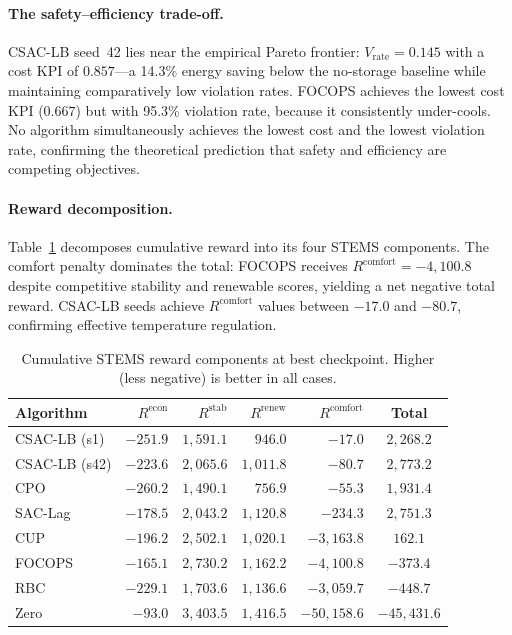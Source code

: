 \paragraph{The safety--efficiency trade-off.}
CSAC-LB seed~42 lies near the empirical Pareto frontier: $V_{\text{rate}} =
0.145$ with a cost KPI of $0.857$---a 14.3\% energy saving below the
no-storage baseline while maintaining comparatively low violation rates.
FOCOPS achieves the
lowest cost KPI ($0.667$) but with 95.3\% violation rate, because it
consistently under-cools.  No algorithm simultaneously achieves the lowest cost
and the lowest violation rate, confirming the theoretical prediction that
safety and efficiency are competing objectives.

\paragraph{Reward decomposition.}
Table~\ref{tab:reward-decomposition} decomposes cumulative reward into its four
STEMS components.  The comfort penalty dominates the total: FOCOPS receives
$R^{\text{comfort}} = -4{,}100.8$ despite competitive stability and renewable
scores, yielding a net negative total reward.  CSAC-LB seeds achieve
$R^{\text{comfort}}$ values between $-17.0$ and $-80.7$, confirming effective
temperature regulation.

\begin{table}[htbp]
\centering
\caption{Cumulative STEMS reward components at best checkpoint.
  Higher (less negative) is better in all cases.}
\label{tab:reward-decomposition}
\begin{tabular}{lrrrrc}
\toprule
\textbf{Algorithm}
  & $R^{\text{econ}}$
  & $R^{\text{stab}}$
  & $R^{\text{renew}}$
  & $R^{\text{comfort}}$
  & \textbf{Total} \\
\midrule
CSAC-LB (s1)  & $-251.9$ & $1{,}591.1$ & $946.0$   & $-17.0$    & $2{,}268.2$ \\
CSAC-LB (s42) & $-223.6$ & $2{,}065.6$ & $1{,}011.8$ & $-80.7$  & $2{,}773.2$ \\
CPO           & $-260.2$ & $1{,}490.1$ & $756.9$   & $-55.3$    & $1{,}931.4$ \\
SAC-Lag       & $-178.5$ & $2{,}043.2$ & $1{,}120.8$ & $-234.3$ & $2{,}751.3$ \\
CUP           & $-196.2$ & $2{,}502.1$ & $1{,}020.1$ & $-3{,}163.8$ & $162.1$ \\
FOCOPS        & $-165.1$ & $2{,}730.2$ & $1{,}162.2$ & $-4{,}100.8$ & $-373.4$ \\
RBC           & $-229.1$ & $1{,}703.6$ & $1{,}136.6$ & $-3{,}059.7$ & $-448.7$ \\
Zero          & $-93.0$  & $3{,}403.5$ & $1{,}416.5$ & $-50{,}158.6$ & $-45{,}431.6$ \\
\bottomrule
\end{tabular}
\end{table}


